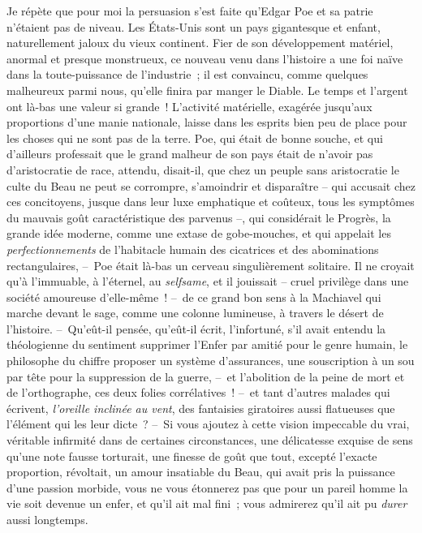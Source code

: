 \documentclass[french,twoside]{book} %
\begin{document}
Je répète que pour moi la persuasion s’est faite qu’Edgar Poe et sa patrie n’étaient pas de niveau. Les États-Unis sont un pays gigantesque et enfant, naturellement jaloux du vieux continent. Fier de son développement matériel, anormal et presque monstrueux, ce nouveau venu dans l’histoire a une foi naïve dans la toute-puissance de l’industrie ; il est convaincu, comme quelques malheureux parmi nous, qu’elle finira par manger le Diable. Le temps et l’argent ont là-bas une valeur si grande ! L’activité matérielle, exagérée jusqu’aux proportions d’une manie nationale, laisse dans les esprits bien peu de place pour les choses qui ne sont pas de la terre. Poe, qui était de bonne souche, et qui d’ailleurs professait que le grand malheur de son pays était de n’avoir pas d’aristocratie de race, attendu, disait-il, que chez un peuple sans aristocratie le culte du Beau ne peut se corrompre, s’amoindrir et disparaître – qui accusait chez ces concitoyens, jusque dans leur luxe emphatique et coûteux, tous les symptômes du mauvais goût caractéristique des parvenus –, qui considérait le Progrès, la grande idée moderne, comme une extase de gobe-mouches, et qui appelait les \emph{perfectionnements} de l’habitacle humain des cicatrices et des abominations rectangulaires, – Poe était là-bas un cerveau singulièrement solitaire. Il ne croyait qu’à l’immuable, à l’éternel, au \emph{selfsame}, et il jouissait – cruel privilège dans une société amoureuse d’elle-même ! – de ce grand bon sens à la Machiavel qui marche devant le sage, comme une colonne lumineuse, à travers le désert de l’histoire. – Qu’eût-il pensée, qu’eût-il écrit, l’infortuné, s’il avait entendu la théologienne du sentiment supprimer l’Enfer par amitié pour le genre humain, le philosophe du chiffre proposer un système d’assurances, une souscription à un sou par tête pour la suppression de la guerre, – et l’abolition de la peine de mort et de l’orthographe, ces deux folies corrélatives ! – et tant d’autres malades qui écrivent, \emph{l’oreille inclinée au vent}, des fantaisies giratoires aussi flatueuses que l’élément qui les leur dicte ? – Si vous ajoutez à cette vision impeccable du vrai, véritable infirmité dans de certaines circonstances, une délicatesse exquise de sens qu’une note fausse torturait, une finesse de goût que tout, excepté l’exacte proportion, révoltait, un amour insatiable du Beau, qui avait pris la puissance d’une passion morbide, vous ne vous étonnerez pas que pour un pareil homme la vie soit devenue un enfer, et qu’il ait mal fini ; vous admirerez qu’il ait pu \emph{durer} aussi longtemps.
\end{document}
